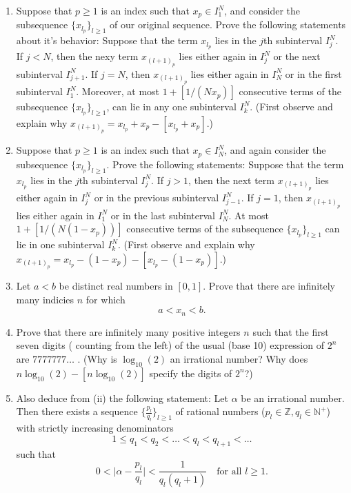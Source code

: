 \documentclass[11pt]{article}
\begin{document}
\begin{enumerate}[leftmargin=0pt, label=\arabic*)]
\begin{enumerate}[label=(\roman*)]
   \item Suppose that \(p \geq 1\) is an index such that \(x_p \in I_1^N\), and consider the subsequence 
     \(\{x_{l_p}\}_{l \geq 1}\) of our original sequence.  Prove the following statements about it's 
     behavior:  Suppose that the term \(x_{l_p}\) lies in the \(j\)th subinterval \(I_j^N\).  If \(j < N\),
     then the nexy term  \(x_{(l+1)_p}\) lies either again in \(I_j^N\) or the next subinterval \(I_{j+1}^N\). 
     If \(j = N\), then \(x_{(l+1)_p}\) lies either again in \(I_N^N\) or in the first subinterval \(I_1^N\). 
     Moreover, at most \(1 + [1/(Nx_p)]\) consecutive terms of the subsequence \(\{x_{l_p}\}_{l \geq 1}\), 
     can lie in any one subinterval \(I_k^N\).  (First observe and explain why \(
     x_{(l+1)_p} = x_{l_p} + x_p - [x_{l_p} + x_p]\).)

   \item Suppose that \(p \geq 1\) is an index such that \(x_p \in I_N^N\), and again consider the 
     subsequence \(\{x_{l_p}\}_{l \geq 1}\).  Prove the following statements: Suppose that the term 
     \(x_{l_p}\) lies in the \(j\)th subinterval \(I_j^N\).  If \(j > 1\), then the next term \(x_{(l+1)_p}\) 
     lies either again in \(I_j^N\) or in the previous subinterval \(I_{j-1}^N\).  If \(j = 1\), then 
     \(x_{(l+1)_p}\) lies either again in \(I_1^N\) or in the last subinterval \(I_N^N\).  At most 
     \(1 + [1/(N(1 - x_p))]\) consecutive terms of the subsequence \(\{x_{l_p}\}_{l \geq 1}\) can lie in 
     one subinterval \(I_k^N\).  (First observe and explain why \(x_{(l+1)_p} = x_{l_p} - (1 - x_p) - 
     [x_{l_p} - (1 - x_p)]\).)

   \item Let \(a < b\) be distinct real numbers in \([0,1]\). Prove that there are infinitely many indicies 
     \(n\) for which \[a < x_n < b.\]

    
   \item Prove that there are infinitely many positive integers \(n\) such that the first seven digits (
     counting from the left) of the usual (base 10) expression of \(2^n\) are \(7777777\dots\) .
     (Why is \(\log_{10}(2)\) an irrational number? Why does \(n\log_{10}(2) - [n\log_{10}(2)]\) specify 
     the digits of \(2^n\)?)
     \newpage

   \item Also deduce from (ii) the following statement: Let \(\alpha\) be an irrational number.  Then there 
     exists a sequence \(\big\{\frac{p_l}{q_l}\big\}_{l \geq 1}\) of rational numbers (\(p_l \in \mathbb{Z}, 
     q_l \in \mathbb{N^+}\)) with strictly increasing denominators 
     \[1 \leq q_1 < q_2 < \hdots < q_l < q_{l+1} < \hdots\]
     such that 
     \[0 < \Big|\alpha - \frac{p_l}{q_l}\Big| < \frac{1}{q_l(q_l + 1)} \quad \text{for all } l \geq 1.\]
  \end{enumerate}
  \newpage


\end{enumerate}
\end{document}

